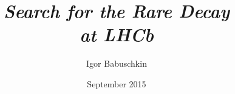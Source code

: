 \documentclass[
  BCOR=12mm,
  parskip=half,
  open=any,
]{tudothesis}
\author{Igor Babuschkin}
\title{\textit{Search for the Rare Decay\\ \bolddecay{} at LHCb}}
\date{September 2015}
\begin{document}
\frontmatter
\maketitle

\makecorrectorpage


\tableofcontents

\mainmatter


\appendix


\backmatter
\printbibliography

\cleardoublepage

\end{document}
